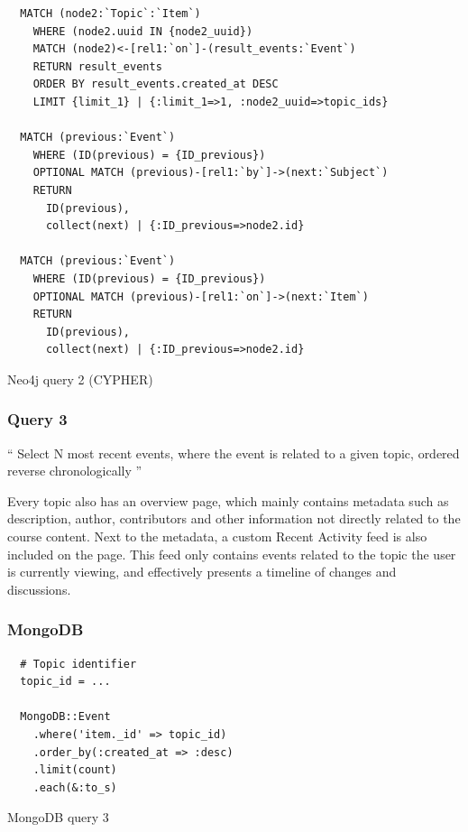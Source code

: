 \begin{listing}[H]
  \begin{verbatim}
  MATCH (node2:`Topic`:`Item`)
    WHERE (node2.uuid IN {node2_uuid})
    MATCH (node2)<-[rel1:`on`]-(result_events:`Event`)
    RETURN result_events
    ORDER BY result_events.created_at DESC
    LIMIT {limit_1} | {:limit_1=>1, :node2_uuid=>topic_ids}

  MATCH (previous:`Event`)
    WHERE (ID(previous) = {ID_previous})
    OPTIONAL MATCH (previous)-[rel1:`by`]->(next:`Subject`)
    RETURN
      ID(previous),
      collect(next) | {:ID_previous=>node2.id}

  MATCH (previous:`Event`)
    WHERE (ID(previous) = {ID_previous})
    OPTIONAL MATCH (previous)-[rel1:`on`]->(next:`Item`)
    RETURN
      ID(previous),
      collect(next) | {:ID_previous=>node2.id}
  \end{verbatim}

  \caption{Neo4j query 2 (CYPHER)}
  \label{lst:neo4j-query-2-cypher}
\end{listing}

\subsubsection{Query 3}
\label{subsubsec:query-3}

``
Select N most recent events, where the event is related to a given topic, ordered reverse chronologically
''

Every topic also has an overview page, which mainly contains metadata such as description, author, contributors and other information not directly related to the course content.
Next to the metadata, a custom Recent Activity feed is also included on the page.
This feed only contains events related to the topic the user is currently viewing, and effectively presents a timeline of changes and discussions.

\subsubsection*{MongoDB}

\begin{listing}[H]
  \begin{verbatim}
  # Topic identifier
  topic_id = ...

  MongoDB::Event
    .where('item._id' => topic_id)
    .order_by(:created_at => :desc)
    .limit(count)
    .each(&:to_s)
  \end{verbatim}

  \caption{MongoDB query 3}
  \label{lst:mongodb-query-3}
\end{listing}

